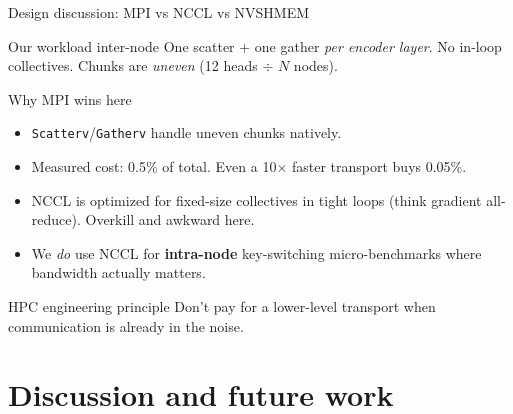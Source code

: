 \documentclass[aspectratio=169]{beamer}
\begin{document}
\begin{frame}{Design discussion: MPI vs NCCL vs NVSHMEM}
  \begin{block}{Our workload inter-node}
    One scatter + one gather \emph{per encoder layer}. No in-loop collectives.
    Chunks are \emph{uneven} (12 heads $\div$ $N$ nodes).
  \end{block}
  \pause
  \begin{block}{Why MPI wins here}
    \small
    \begin{itemize}
      \item \texttt{Scatterv}/\texttt{Gatherv} handle uneven chunks natively.
      \item Measured cost: 0.5\% of total. Even a 10$\times$ faster transport buys 0.05\%.
      \item NCCL is optimized for fixed-size collectives in tight loops (think
            gradient all-reduce). Overkill and awkward here.
      \item We \emph{do} use NCCL for \textbf{intra-node} key-switching
            micro-benchmarks where bandwidth actually matters.
    \end{itemize}
  \end{block}
  \pause
  \begin{alertblock}{HPC engineering principle}
    Don't pay for a lower-level transport when communication is already
    in the noise.
  \end{alertblock}
\end{frame}

\section{Discussion and future work}
\end{document}
